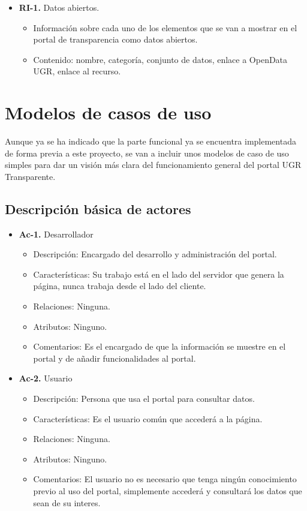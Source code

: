 \begin{itemize}
  \item \textbf{RI-1.} Datos abiertos.
  \begin{itemize}
    \item Información sobre cada uno de los elementos que se van a mostrar en el portal de transparencia como datos abiertos.
    \item Contenido: nombre, categoría, conjunto de datos, enlace a OpenData UGR, enlace al recurso.
  \end{itemize}
\end{itemize}

\section{Modelos de casos de uso}

Aunque ya se ha indicado que la parte funcional ya se encuentra implementada de forma previa a este proyecto, se van a incluir
unos modelos de caso de uso simples para dar un visión más clara del funcionamiento general del portal UGR Transparente.

\newpage
\subsection{Descripción básica de actores}

\begin{itemize}
  \item \textbf{Ac-1.} Desarrollador
  \begin{itemize}
   \item Descripción: Encargado del desarrollo y administración del portal.
   \item Características: Su trabajo está en el lado del servidor que genera la página, nunca trabaja desde el lado del cliente.
   \item Relaciones: Ninguna.
   \item Atributos: Ninguno.
   \item Comentarios: Es el encargado de que la información se muestre en el portal y de añadir funcionalidades al portal.
  \end{itemize}
  
  \item \textbf{Ac-2.} Usuario
  \begin{itemize}
   \item Descripción: Persona que usa el portal para consultar datos.
   \item Características: Es el usuario común que accederá a la página.
   \item Relaciones: Ninguna.
   \item Atributos: Ninguno.
   \item Comentarios: El usuario no es necesario que tenga ningún conocimiento previo al uso del portal, simplemente
   accederá y consultará los datos que sean de su interes.
  \end{itemize}
\end{itemize}

